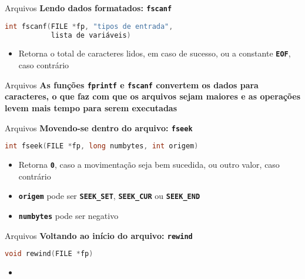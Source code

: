 \documentclass[10pt]{beamer}
\begin{document}
\begin{frame}[fragile]{Arquivos}
  \huge
  \textbf{Lendo dados formatados: \texttt{fscanf}}
  \vfill
  \large
  \begin{lstlisting}[language=C]
int fscanf(FILE *fp, "tipos de entrada",
           lista de variáveis)
  \end{lstlisting}
  \vfill
  \setlength{\leftmargini}{0pt}
  \begin{itemize}
      \item [] Retorna o total de caracteres lidos, em caso de sucesso, ou a constante \textbf{\texttt{EOF}}, caso contrário
  \end{itemize}
\end{frame}

\begin{frame}{Arquivos}
  \huge
  \textbf{As funções \texttt{fprintf} e \texttt{fscanf} convertem os dados para caracteres, o que faz com que os arquivos sejam maiores e as operações levem mais tempo para serem executadas}
\end{frame}

\begin{frame}[fragile]{Arquivos}
  \huge
  \textbf{Movendo-se dentro do arquivo: \texttt{fseek}}
  \vfill
  \large
  \begin{lstlisting}[language=C]
int fseek(FILE *fp, long numbytes, int origem)
  \end{lstlisting}
  \vfill
  \setlength{\leftmargini}{0pt}
  \begin{itemize}
      \item [] Retorna \texttt{\textbf{0}}, caso a movimentação seja bem sucedida, ou outro valor, caso contrário
      \item [] \texttt{\textbf{origem}} pode ser \texttt{\textbf{SEEK\_SET}}, \texttt{\textbf{SEEK\_CUR}} ou \texttt{\textbf{SEEK\_END}}
      \item [] \texttt{\textbf{numbytes}} pode ser negativo
  \end{itemize}
\end{frame}

\begin{frame}[fragile]{Arquivos}
  \huge
  \textbf{Voltando ao início do arquivo: \texttt{rewind}}
  \vfill
  \large
  \begin{lstlisting}[language=C]
void rewind(FILE *fp)
  \end{lstlisting}
  \vfill
  \setlength{\leftmargini}{0pt}
  \begin{itemize}
      \item []
  \end{itemize}
\end{frame}
\end{document}
